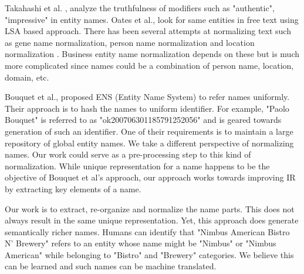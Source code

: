 \documentclass{acm_proc_article-sp}
\begin{document}
Takahashi et al. \cite{Takahashi:2010:ETM:1884017.1884070}, analyze the truthfulness of modifiers such as "authentic", "impressive" in entity names. Oates et al.,\cite{Oates:2002:ULS:584931.584939} look for same entities in free text using LSA based approach. There has been several attempts at normalizing text such as gene name normalization\cite{Fang:2006:HGN:1567619.1567627}, person name normalization\cite{Magdy:2007:ACP:1654576.1654582} and location normalization \cite{Li:2002:LNI:1072228.1072355}. Business entity name normalization depends on these but is much more complicated since names could be a combination of person name, location, domain, etc.

Bouquet et al.,\cite{Bouquet:2008:ENS:1446294.1446425} proposed ENS (Entity Name System) to refer names uniformly. Their approach is to hash the names to uniform identifier. For example, "Paolo Bouquet" is referred to as "ok200706301185791252056" and is geared towards generation of such an identifier. One of their requirements is to maintain a large repository of global entity names. We take a different perspective of normalizing names. Our work could serve as a pre-processing step to this kind of normalization. While unique representation for a name happens to be the objective of Bouquet et al's approach, our approach works towards improving IR by extracting key elements of a name. 

Our work is to extract, re-organize and normalize the name parts. This does not always result in the same unique representation. Yet, this approach does generate semantically richer names. Humans can identify that "Nimbus American Bistro N' Brewery" refers to an entity whose name might be "Nimbus" or "Nimbus American" while belonging to "Bistro" and "Brewery" categories. We believe this can be learned and such names can be machine translated.
\end{document}
